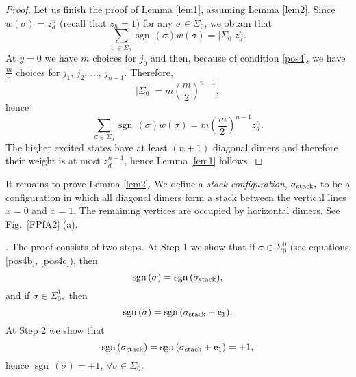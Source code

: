 \documentclass[12pt,reqno]{amsart}
\numberwithin{equation}{section}
\newcommand{\sg}{\sigma}
\newcommand{\sgn}{{\operatorname{sgn}\,}}
\begin{document}
\begin{proof}
Let us finish the proof of Lemma \ref{lem1}, assuming Lemma \ref{lem2}.
Since $w(\sg)=z_d^n$ (recall that $z_h=1$) for any $\sg\in \Sigma_0$, we obtain that
\begin{equation}\label{pos6}
\sum_{\sg\in\Sigma_0} \sgn(\sg) w(\sg)=|\Sigma_0|z_d^n.
\end{equation} 
At $y=0$ we have $m$ choices for $j_0$ and then,
because of condition \eqref{pos4}, we have $\frac{m}{2}$ choices for $j_1,\,j_2,\,\ldots,\, j_{n-1}$. Therefore,
\begin{equation}\label{pos7}
|\Sigma_0|=m\left(\frac{m}{2}\right)^{n-1},
\end{equation} 
hence
\begin{equation}\label{pos8}
\sum_{\sg\in\Sigma_0} \sgn(\sg) w(\sg)=m\left(\frac{m}{2}\right)^{n-1}z_d^n.
\end{equation} 
The higher excited states have at least $(n+1)$ diagonal dimers and therefore their weight is at most $z_d^{n+1}$, hence Lemma \ref{lem1} follows. \end{proof}

It remains to prove Lemma \ref{lem2}. We define a \textit{stack configuration}, $\sg_{\rm stack},$ to be a configuration in which all diagonal dimers form a stack between the vertical lines $x=0$ and $x=1$. The remaining vertices are occupied by horizontal dimers. See Fig.\ \ref{FPfA2} (a).

. The proof consists of two steps. At Step 1 we show that if $\sigma\in\Sigma_0^0$ (see equations \eqref{pos4b},  \eqref{pos4c}), then 
\begin{equation}\label{pos9}
\sgn(\sigma)=\sgn(\sigma_{\rm stack}),
\end{equation}
and if $\sg\in\Sigma_0^1,$ then
\begin{equation}\label{pos9a}
\sgn(\sigma)=\sgn(\sigma_{\rm stack}+\mathsf e_1).
\end{equation}
At Step 2 we show that 
\begin{equation}\label{pos10}
\sgn(\sigma_{\rm stack})=\sgn(\sigma_{\rm stack}+\mathsf e_1)=+1,
\end{equation}
hence $\sgn(\sigma)=+1$, $\forall\sg\in\Sigma_0$.\\
\end{document}
